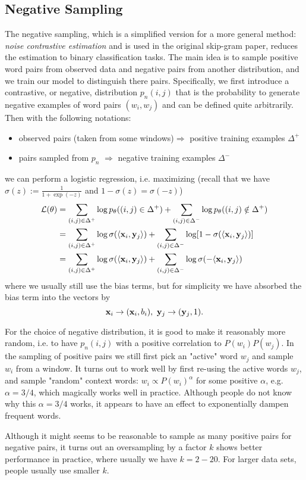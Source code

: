 \documentclass[../main.tex]{subfiles}
\begin{document}
\subsection{Negative Sampling}
\par The negative sampling, which is a simplified version for a more general method: \emph{noise contrastive estimation} and is used in the original skip-gram paper, reduces the estimation to binary classification tasks. The main idea is to sample positive word pairs from observed data and negative pairs from another distribution, and we train our model to distinguish there pairs. Specifically, we first introduce a contrastive, or negative, distribution $p_n(i,j)$ that is the probability to generate negative examples of word pairs $(w_i,w_j)$ and can be defined quite arbitrarily. Then with the following notations:
\begin{itemize}
	\item observed pairs (taken from some windows)$\Longrightarrow$ positive training examples $\Delta^+$
	\item pairs sampled from $p_n$ $\Longrightarrow$ negative training examples $\Delta^-$
\end{itemize}
we can perform a logistic regression, i.e. maximizing (recall that we have $\sigma(z):=\frac{1}{1+\exp(-z)}$ and $1-\sigma(z)=\sigma(-z)$)
\begin{align}
\mathcal{L}(\theta) &= \sum_{(i,j)\in \Delta^+} \log p_{\theta} ((i,j)\in\Delta^+) + \sum_{(i,j)\in \Delta^-} \log p_{\theta} ((i,j)\notin\Delta^+) \notag\\
&=\sum_{(i,j)\in \Delta^+} \log \sigma(\langle {\bf x}_i, {\bf y}_j\rangle) +\sum_{(i,j)\in \Delta^-} \log [1-\sigma(\langle {\bf x}_i, {\bf y}_j\rangle)]\notag\\
\label{eq_5_ns_lg}&=\sum_{(i,j)\in \Delta^+} \log \sigma(\langle {\bf x}_i, {\bf y}_j\rangle) +\sum_{(i,j)\in \Delta^-} \log \sigma(-\langle {\bf x}_i, {\bf y}_j\rangle)
\end{align}
where we usually still use the bias terms, but for simplicity we have absorbed the bias term into the vectors by
\begin{equation*}
{\bf x}_i\rightarrow ({\bf x}_i, b_i),\ {\bf y}_j\rightarrow ({\bf y}_j, 1).
\end{equation*}
\par For the choice of negative distribution, it is good to make it reasonably more random, i.e. to have $p_n(i,j)$ with a positive correlation to $P(w_i)P(w_j)$. In the sampling of positive pairs we still first pick an "active" word $w_j$ and sample $w_i$ from a window. It turns out to work well by first re-using the active words $w_j$, and sample "random" context words: $w_i\propto P(w_i)^\alpha$ for some positive $\alpha$, e.g. $\alpha = 3/4$, which magically works well in practice. Although people do not know why this $\alpha = 3/4$ works, it appears to have an effect to exponentially dampen frequent words.
\par Although it might seems to be reasonable to sample as many positive pairs for negative pairs, it turns out an oversampling by a factor $k$ shows better performance in practice, where usually we have $k=2-20$. For larger data sets, people usually use smaller $k$.
\end{document}
